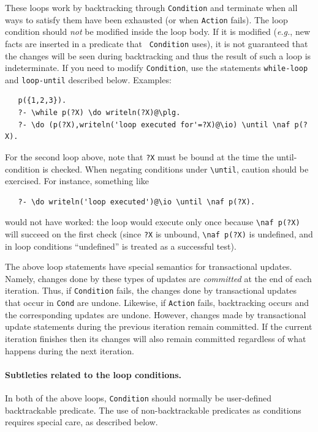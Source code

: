 \documentclass[11pt]{article}
\newcommand{\bs}{\textbackslash}
\newcommand{\RULELOGNAF}{{\texttt{{\bs}naf}}\xspace}
\begin{document}
These loops work by backtracking through {\tt Condition} and terminate when
all ways to satisfy them have been exhausted (or when {\tt Action} fails).
The loop condition should \emph{not} be modified inside the loop body.  If
it is modified ({\it e.g.}, new facts are inserted in a predicate that {\tt
  Condition} uses), it is not guaranteed that the changes will be seen
during backtracking and thus the result of such a loop is indeterminate.
If you need to modify {\tt Condition}, use the statements {\tt while-loop}
and {\tt loop-until} described below. Examples:
\begin{verbatim}
   p({1,2,3}).
   ?- \while p(?X) \do writeln(?X)@\plg.
   ?- \do (p(?X),writeln('loop executed for'=?X)@\io) \until \naf p(?X).
\end{verbatim}
For the second loop above, note that \texttt{?X} must be bound at the time
the until-condition is checked. When negating conditions under
\texttt{\bs{}until}, caution should be exercised. For instance, something like
\begin{verbatim}
   ?- \do writeln('loop executed')@\io \until \naf p(?X).
\end{verbatim}
would not have worked: the loop would execute only once because
\texttt{\RULELOGNAF p(?X)} will succeed on the first check (since
\texttt{?X} is unbound, \texttt{\RULELOGNAF p(?X)} is undefined, and in
loop conditions ``undefined'' is treated as a successful test).   

The above loop statements have special semantics for transactional updates.
Namely, changes done by these types of updates are \emph{committed} at the
end of each iteration. Thus, if {\tt Condition} fails, the changes done by
transactional updates that occur in {\tt Cond} are undone. Likewise, if
{\tt Action} fails, backtracking occurs and the corresponding updates are
undone. However, changes made by transactional update statements during the
previous iteration remain committed. If the current iteration finishes then
its changes will also remain committed regardless of what happens during
the next iteration.

\paragraph{Subtleties related to the loop conditions.}
In both of the above loops, \texttt{Condition} should normally be
user-defined backtrackable predicate. The use of
non-backtrackable predicates as conditions
requires special care, as described below.
\end{document}
